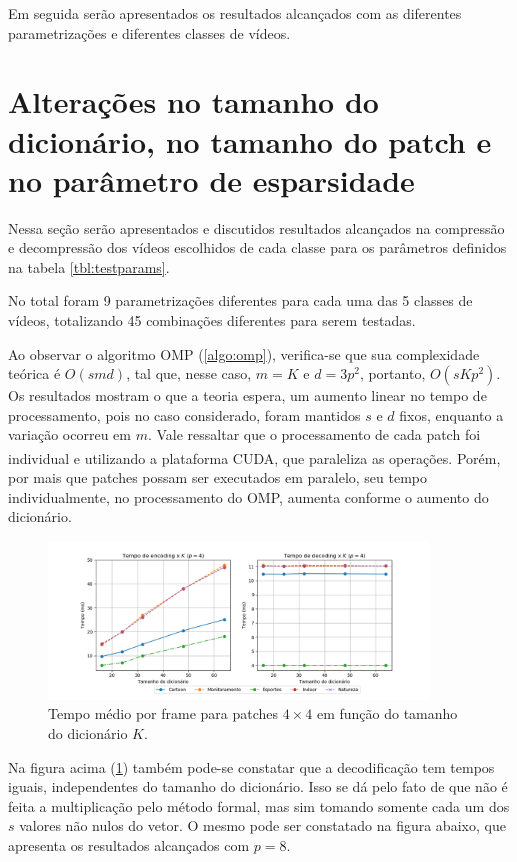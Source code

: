 \documentclass[cic,tc]{iiufrgs}
\newcommand{\reg}{\textsuperscript{\textregistered}}
\begin{document}
Em seguida serão apresentados os resultados alcançados com as diferentes parametrizações 
e diferentes classes de vídeos.

\section{Alterações no tamanho do dicionário, no tamanho do patch e no parâmetro de esparsidade}
\label{sec:parametrizacao}
Nessa seção serão apresentados e discutidos resultados alcançados na compressão e 
decompressão dos vídeos escolhidos de cada classe para os parâmetros definidos na 
tabela \ref{tbl:testparams}.

No total foram 9 parametrizações diferentes para cada uma das 5 classes de vídeos, 
totalizando 45 combinações diferentes para serem testadas.

Ao observar o algoritmo OMP (\ref{algo:omp}), verifica-se que sua complexidade teórica 
é $O(s m d)$, tal que, nesse caso, $m = K$ e $d = 3p^2$, portanto, $O(s K p^2)$.
Os resultados mostram o que a teoria espera, um aumento linear no tempo de processamento,
pois no caso considerado, foram mantidos $s$ e $d$ fixos, enquanto a variação ocorreu em $m$.
Vale ressaltar que o processamento de cada patch foi individual e utilizando a plataforma 
CUDA\reg, que paraleliza as operações.
Porém, por mais que patches possam ser executados em paralelo, seu tempo individualmente, 
no processamento do OMP, aumenta conforme o aumento do dicionário.

\begin{figure}[H]
    \caption{Tempo médio por frame para patches $4\times4$ em função do tamanho do dicionário $K$.}
    \begin{center}
        \includegraphics[width=0.9\textwidth]{img/graficos/p4_ds_edtime.png}
    \end{center}
    \label{fig:timep4}
\end{figure}

Na figura acima (\ref{fig:timep4}) também pode-se constatar que a decodificação tem tempos iguais, independentes
do tamanho do dicionário.
Isso se dá pelo fato de que não é feita a multiplicação pelo método formal, mas sim tomando
somente cada um dos $s$ valores não nulos do vetor.
O mesmo pode ser constatado na figura abaixo, que apresenta os resultados alcançados com $p=8$.
\end{document}
